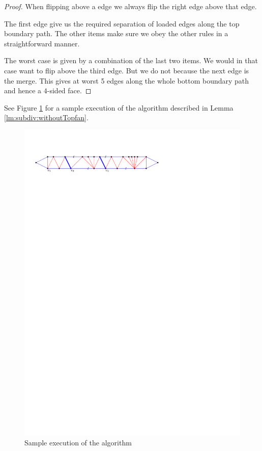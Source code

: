 \begin{proof}
  When flipping above a edge we always flip the right edge above that edge.

  The first edge give us the required separation of loaded edges along the top boundary path. The other items make sure we obey the other rules in a straightforward manner.

  The worst case is given by a combination of the last two items. We would in that case want to flip above the third edge. But we do not because the next edge is the merge. This gives at worst 5 edges along the whole bottom boundary path and hence a $4$-sided face.



\end{proof}

See Figure \ref{fig:subdiv:sampleExecution} for a sample execution of the algorithm described in Lemma \ref{lm:subdiv:withoutTopfan}.

\begin{figure}[h]
  \centering
  \includegraphics[scale=1]{blueFaceSubdivision/img/sampleExecution}
  \caption{Sample execution of the algorithm}
  \label{fig:subdiv:sampleExecution}
\end{figure}


